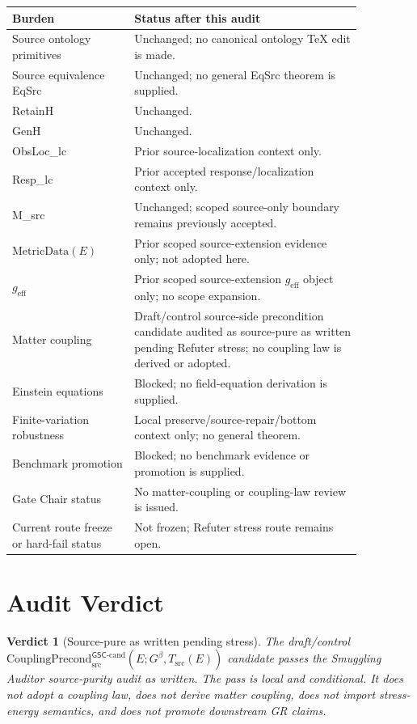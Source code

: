 \documentclass[11pt]{article}
\newcommand{\Gbeta}{G^\beta}
\newcommand{\geff}{g_{\mathrm{eff}}}
\newcommand{\CouplingPrecond}{\mathrm{CouplingPrecond}^{\mathsf{GSC}\mbox{-}\mathrm{cand}}_{\mathrm{src}}}
\newtheorem{verdict}{Verdict}
\begin{document}
\begin{longtable}{p{0.30\linewidth}p{0.56\linewidth}}
\toprule
Burden & Status after this audit \\
\midrule
Source ontology primitives & Unchanged; no canonical ontology TeX edit is made. \\
Source equivalence EqSrc & Unchanged; no general EqSrc theorem is supplied. \\
RetainH & Unchanged. \\
GenH & Unchanged. \\
ObsLoc\_lc & Prior source-localization context only. \\
Resp\_lc & Prior accepted response/localization context only. \\
M\_src & Unchanged; scoped source-only boundary remains previously accepted. \\
\(\mathrm{MetricData}(E)\) & Prior scoped source-extension evidence only; not adopted here. \\
\(\geff\) & Prior scoped source-extension \(\geff\) object only; no scope expansion. \\
Matter coupling & Draft/control source-side precondition candidate audited as source-pure as written pending Refuter stress; no coupling law is derived or adopted. \\
Einstein equations & Blocked; no field-equation derivation is supplied. \\
Finite-variation robustness & Local preserve/source-repair/bottom context only; no general theorem. \\
Benchmark promotion & Blocked; no benchmark evidence or promotion is supplied. \\
Gate Chair status & No matter-coupling or coupling-law review is issued. \\
Current route freeze or hard-fail status & Not frozen; Refuter stress route remains open. \\
\bottomrule
\end{longtable}

\section{Audit Verdict}

\begin{verdict}[Source-pure as written pending stress]
The draft/control \(\CouplingPrecond(E;\Gbeta,T_{\mathrm{src}}(E))\)
candidate passes the Smuggling Auditor source-purity audit as written. The
pass is local and conditional. It does not adopt a coupling law, does not
derive matter coupling, does not import stress-energy semantics, and does not
promote downstream GR claims.
\end{verdict}
\end{document}
